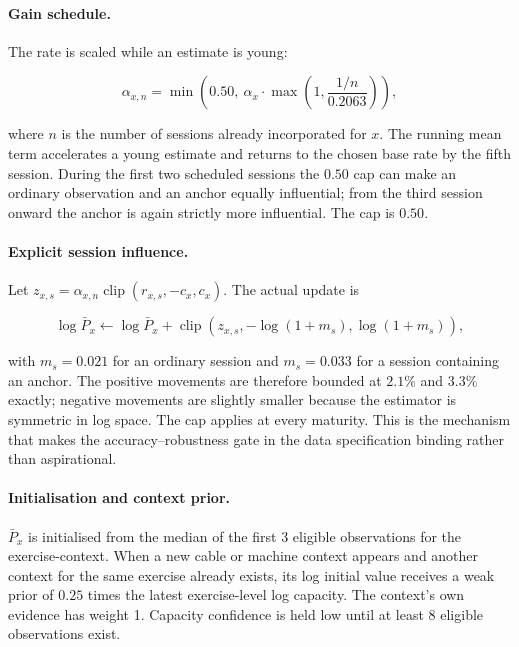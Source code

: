 \documentclass[11pt]{article}
\begin{document}
\paragraph{Gain schedule.} The rate is scaled while an estimate is young:

\begin{equation}
\alpha_{x,n}=\min\left(0.50,\ \alpha_x\cdot\max\left(1,\frac{1/n}{0.2063}\right)\right),
\end{equation}

where $n$ is the number of sessions already incorporated for $x$. The running
mean term accelerates a young estimate and returns to the chosen base rate by
the fifth session. During the first two scheduled sessions the $0.50$ cap can
make an ordinary observation and an anchor equally influential; from the third
session onward the anchor is again strictly more influential. The cap is
$0.50$.

\paragraph{Explicit session influence.} Let
$z_{x,s}=\alpha_{x,n}\operatorname{clip}(r_{x,s},-c_x,c_x)$. The actual update is

\begin{equation}
\log\bar P_x\leftarrow\log\bar P_x+
\operatorname{clip}\left(z_{x,s},-\log(1+m_s),\log(1+m_s)\right),
\label{eq:session-bound}
\end{equation}

with $m_s=0.021$ for an ordinary session and $m_s=0.033$ for a session
containing an anchor. The positive movements are therefore bounded at $2.1\%$
and $3.3\%$ exactly; negative movements are slightly smaller because the
estimator is symmetric in log space. The cap applies at every maturity. This is
the mechanism that makes the accuracy--robustness gate in the data
specification binding rather than aspirational.

\paragraph{Initialisation and context prior.} $\bar P_x$ is initialised from
the median of the first $3$ eligible observations for the exercise-context.
When a new cable or machine context appears and another context for the same
exercise already exists, its log initial value receives a weak prior of $0.25$
times the latest exercise-level log capacity. The context's own evidence has
weight 1. Capacity confidence is held low until at least $8$ eligible
observations exist.
\end{document}

